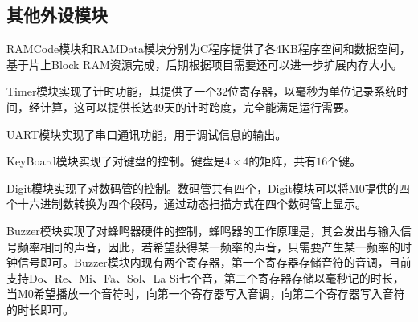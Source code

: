 \subsection{其他外设模块}
RAMCode模块和RAMData模块分别为C程序提供了各4KB程序空间和数据空间，基于片上Block RAM资源完成，后期根据项目需要还可以进一步扩展内存大小。

Timer模块实现了计时功能，其提供了一个32位寄存器，以毫秒为单位记录系统时间，经计算，这可以提供长达49天的计时跨度，完全能满足运行需要。

UART模块实现了串口通讯功能，用于调试信息的输出。

KeyBoard模块实现了对键盘的控制。键盘是$4\times 4$的矩阵，共有$16$个键。

Digit模块实现了对数码管的控制。数码管共有四个，Digit模块可以将M0提供的四个十六进制数转换为四个段码，通过动态扫描方式在四个数码管上显示。

Buzzer模块实现了对蜂鸣器硬件的控制，蜂鸣器的工作原理是，其会发出与输入信号频率相同的声音，因此，若希望获得某一频率的声音，只需要产生某一频率的时钟信号即可。Buzzer模块内现有两个寄存器，第一个寄存器存储音符的音调，目前支持Do、Re、Mi、Fa、Sol、La Si七个音，第二个寄存器存储以毫秒记的时长，当M0希望播放一个音符时，向第一个寄存器写入音调，向第二个寄存器写入音符的时长即可。